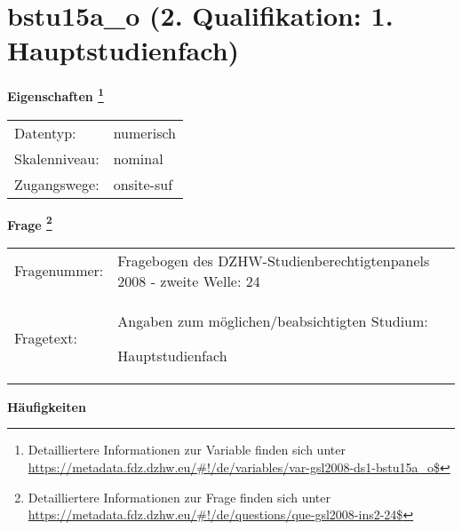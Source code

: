 
    \setcounter{footnote}{0}

    \vspace*{-1.8cm}
	\section{bstu15a\_o (2. Qualifikation: 1. Hauptstudienfach)}
	\label{section:bstu15a_o}



    \vspace*{0.5cm}
    \noindent\textbf{Eigenschaften
	\footnote{Detailliertere Informationen zur Variable finden sich unter
		\url{https://metadata.fdz.dzhw.eu/\#!/de/variables/var-gsl2008-ds1-bstu15a_o$}}}\\
	\begin{tabularx}{\hsize}{@{}lX}
	Datentyp: & numerisch \\
	Skalenniveau: & nominal \\
	Zugangswege: &
	  onsite-suf
 \\
    \end{tabularx}



				\vspace*{0.5cm}
                \noindent\textbf{Frage
	                \footnote{Detailliertere Informationen zur Frage finden sich unter
		              \url{https://metadata.fdz.dzhw.eu/\#!/de/questions/que-gsl2008-ins2-24$}}}\\
				\begin{tabularx}{\hsize}{@{}lX}
					Fragenummer: &
					  Fragebogen des DZHW-Studienberechtigtenpanels 2008 - zweite Welle:
					  24
 \\
					Fragetext: & Angaben zum möglichen/beabsichtigten Studium:\par  Hauptstudienfach \\
				\end{tabularx}





        		\vspace*{0.5cm}
                \noindent\textbf{Häufigkeiten}

